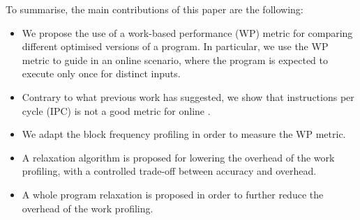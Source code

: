 
To summarise, the main contributions of this paper are the following:
\begin{itemize}
\item We propose the use of a work-based performance (WP) metric for comparing different optimised versions of a program.
      In particular, we use the WP metric to guide {\itercomp} in an online scenario, where the program is expected to execute only once for distinct inputs.

\item Contrary to what previous work has suggested, we show that instructions per cycle (IPC) is not a good metric for online {\itercomp}.
\item We adapt the block frequency profiling in order to measure the WP metric.
\item A relaxation algorithm is proposed for lowering the overhead of the work profiling, with a controlled trade-off between accuracy and overhead.
\item A whole program relaxation is proposed in order to further reduce the overhead of the work profiling.
\end{itemize}
